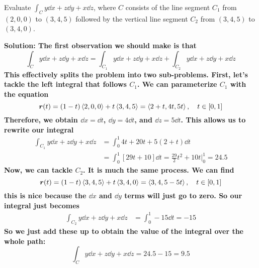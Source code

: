 \begin{example}
    Evaluate $\int_C y\dd x + z\dd y + x\dd z$, where $C$ consists of the line segment $C_1$ from $(2,0,0)$ to $(3,4,5)$ followed by the vertical line segment $C_2$ from $(3,4,5)$ to $(3,4,0)$.
    \par\bf{Solution: }The first observation we should make is that
    \[ \int_C y\dd x + z\dd y + x\dd z = \int_{C_1}y\dd x + z\dd y + x\dd z + \int_{C_2}y\dd x + z\dd y + x\dd z\]
    This effectively splits the problem into two sub-problems. First, let's tackle the left integral that follows $C_1$. We can parameterize $C_1$ with the equation
    \[ \boldsymbol{r}(t) = (1-t)\left\langle2,0,0\right\rangle + t\left\langle3,4,5\right\rangle = \left\langle 2+t, 4t, 5t\right\rangle, \quad t\in[0,1] \]
    Therefore, we obtain $\dd x = \dd t$, $\dd y = 4\dd t$, and $\dd z = 5\dd t$. This allows us to rewrite our integral
    \begin{align*}
        \int_{C_1}y\dd x + z\dd y + x\dd z &= \int_0^1 4t + 20t + 5(2+t) \dd t \\
        &= \int_0^1 [29t+10]\dd t = \frac{29}{2}t^2+10t\biggr|_0^1 = 24.5
    \end{align*}
    Now, we can tackle $C_2$. It is much the same process. We can find
    \[ \boldsymbol{r}(t) = (1-t)\left\langle3,4,5\right\rangle + t\left\langle3,4,0\right\rangle = \left\langle 3, 4, 5-5t\right\rangle, \quad t\in[0,1]\]
    this is nice because the $\dd x$ and $\dd y$ terms will just go to zero. So our integral just becomes
    \begin{align*}
        \int_{C_2}y\dd x + z\dd y + x\dd z &= \int_0^1 -15\dd t = -15
    \end{align*}
    So we just add these up to obtain the value of the integral over the whole path:
    \[ \int_C y\dd x + z\dd y + x\dd z = 24.5-15 = 9.5\]
\end{example}
